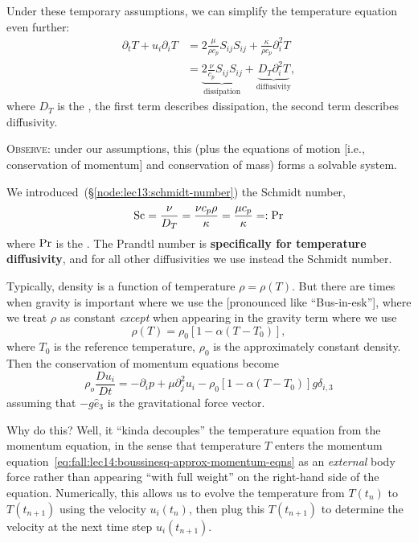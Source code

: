 \begin{node}
Under these temporary assumptions, we can simplify the temperature
equation even further:
\begin{subequations}
  \begin{align}
\partial_{t}T+u_{i}\partial_{i}T &= 2\frac{\mu}{\rho c_{p}}S_{ij}S_{ij}+\frac{\kappa}{\rho c_{p}}\partial_{i}^{2}T\\
&=\underbrace{2\frac{\nu}{c_{p}}S_{ij}S_{ij}}_{\text{dissipation}} + \underbrace{D_{T}\partial_{i}^{2}T}_{\text{diffusivity}},
  \end{align}
\end{subequations}
where $D_{T}$ is the , the
first term describes dissipation, the second term describes diffusivity.

\textsc{Observe}: under our assumptions, this (plus the equations of
motion [i.e., conservation of momentum] and conservation of mass)
forms a solvable system.
\end{node}

\begin{recall}
We introduced~(\S\ref{node:lec13:schmidt-number}) the Schmidt number,
\begin{equation}
\mathrm{Sc} = \frac{\nu}{D_{T}}  = \frac{\nu c_{p}\rho}{\kappa}=\frac{\mu c_{p}}{\kappa}=:\mathrm{Pr}
\end{equation}
where $\mathrm{Pr}$ is the . The Prandtl number is
\textbf{specifically for temperature diffusivity}, and for all other
diffusivities we use instead the Schmidt number.
\end{recall}

\begin{node}
Typically, density is a function of temperature $\rho=\rho(T)$. But there are
times when gravity is important where we use the 
[pronounced like ``Bus-in-esk''], where we treat $\rho$ as constant
\emph{except} when appearing in the gravity term where we use
\begin{equation}
\rho(T)=\rho_{0}[1-\alpha(T-T_{0})],
\end{equation}
where $T_{0}$ is the reference temperature, $\rho_{0}$ is the
approximately constant density. Then the conservation of momentum
equations become
\begin{equation}\label{eq:fall:lec14:boussinesq-approx-momentum-eqns}
\rho_{o}\frac{Du_{i}}{Dt}=-\partial_{i}p+\mu\partial_{j}^{2}u_{i}-\rho_{0}[1-\alpha(T-T_{0})]g\delta_{i,3}
\end{equation}
assuming that $-g\widehat{e}_{3}$ is the gravitational force vector.

Why do this? Well, it ``kinda decouples'' the temperature equation
from the momentum equation, in the sense that temperature $T$ enters
the momentum equation~\eqref{eq:fall:lec14:boussinesq-approx-momentum-eqns}
as an \emph{external} body force rather than appearing ``with full
weight'' on the right-hand side of the equation. Numerically, this
allows us to evolve the temperature from $T(t_{n})$ to $T(t_{n+1})$
using the velocity $u_{i}(t_{n})$, then plug this $T(t_{n+1})$ to
determine the velocity at the next time step $u_{i}(t_{n+1})$.
\end{node}

